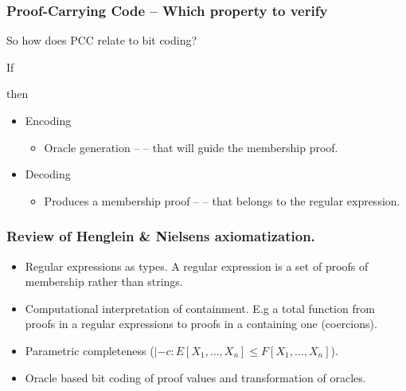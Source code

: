 \documentclass[slidestop,compress,mathserif, xcolor=table]{beamer}
\begin{document}
\begin{frame}
  \frametitle{Proof-Carrying Code -- Which property to verify}
  
  So how does PCC relate to bit coding?\newline


  If

  \begin{block}{}
  \end{block}

  then
  
  \begin{itemize}
    
  \item Encoding
    \begin{itemize}
    \item Oracle generation --  -- that will guide the membership proof.
    \end{itemize}
    
  \item Decoding
    \begin{itemize}
    \item Produces a membership proof --  -- that
      belongs to the regular expression.
    \end{itemize}
    
  \end{itemize}
  
\end{frame}

\begin{frame}
  \frametitle{Review of Henglein \& Nielsens\cite{heni2010} axiomatization.}
  \begin{itemize}
  \item Regular expressions as types. A regular expression is a set of proofs of
    membership rather than strings.
  \item Computational interpretation of containment. E.g a total function from
    proofs in a regular expressions to proofs in a containing one (coercions).
  \item Parametric completeness ($|- c : E[X_1, \ldots, X_n] \leq F[X_1,
    \ldots, X_n]$).
  \item Oracle based bit coding of proof values and transformation of oracles.
  \end{itemize}
\end{frame}
\end{document}

